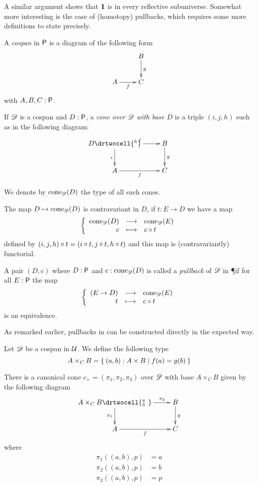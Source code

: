 A similar argument shows that $\unit$ is in every reflective subuniverse.
Somewhat more interesting is the case of (homotopy) pullbacks, which requires some more definitions to state precisely.

\begin{defn}
  A \emph{cospan} in $\P$ is a diagram of the following form
  \[\xymatrix{& B \ar^g[d] \\ A \ar_f[r] & C}\]
  with $A,B,C:\P$.
\end{defn}

\begin{defn}
  If $\Ddiag$ is a cospan and $D:\P$, a \emph{cone over $\Ddiag$ with
    base $D$} is a triple $(i,j,h)$ such as in the following diagram:
  \[\uppercurveobject{{ }}\lowercurveobject{{ }}\twocellhead{{ }}
  \xymatrix{D \ar^j[r] \ar_i[d] \drtwocell{^h} & B \ar^g[d] \\
    A \ar_f[r] & C
  }\]

  We denote by $\cone{\Ddiag}{D}$ the type of all such cones.
\end{defn}

The map $D\mapsto\cone{\Ddiag}{D}$ is contravariant in $D$, if $t:E\to{}D$ we
have a map
\[\function{\cone{\Ddiag}{D}}{\cone{\Ddiag}{E}}{c}{\composecone{t}{c}}\]
defined by $\composecone{t}{(i,j,h)}=(i\circ{}t,j\circ{}t,h\circ{}t)$ and this
map is (contravariantly) functorial.

\begin{defn}
  A pair $(D,c)$ where $D:\P$ and $c:\cone{\Ddiag}{D}$ is called a
  \emph{pullback} of $\Ddiag$ in \P if for all $E:\P$ the map
  \[\function{(E\to{}D)}{\cone{\Ddiag}{E}}{t}{\composecone{t}{c}}\]
  is an equivalence.
\end{defn}

As remarked earlier, pullbacks in \type can be constructed directly in the expected way.

\begin{defn}
  Let $\Ddiag$ be a cospan in $\type$. We define the following type
  \[A\times_CB=\setof{(a,b):A\times{}B | f(a) = g(b)}\]

  There is a canonical cone $c_\times=(\pi_1,\pi_2,\pi_3)$ over $\Ddiag$ with
  base $A\times_CB$ given by the following diagram
  \[\uppercurveobject{{ }}\lowercurveobject{{ }}\twocellhead{{ }}
  \xymatrix{A\times_CB \ar^-{\pi_2}[r] \ar_{\pi_1}[d] \drtwocell{^\pi_3\ }
    & B \ar^g[d] \\ A \ar_f[r] & C}\]
  where
  \begin{align*}
    \pi_1((a,b),p)&=a\\
    \pi_2((a,b),p)&=b\\
    \pi_3((a,b),p)&=p\\
  \end{align*}
\end{defn}

